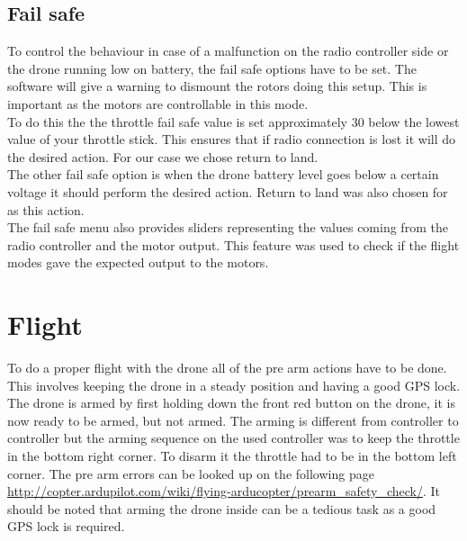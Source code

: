 \subsection*{Fail safe}
To control the behaviour in case of a malfunction on the radio controller side or the drone running
low on battery, the fail safe options have to be set. The software will give a warning to dismount
the rotors doing this setup. This is important as the motors are controllable in this mode.\\
To do this the the throttle fail safe value is set approximately 30 below the lowest value of your
throttle stick. This ensures that if radio connection is lost it will do the desired action. For our
case we chose return to land.\\
The other fail safe option is when the drone battery level goes below a certain voltage it should
perform the desired action. Return to land was also chosen for as this action.\\
The fail safe menu also provides sliders representing the values coming from the radio controller
and the motor output. This feature was used to check if the flight modes gave the expected output to
the motors.

\section{Flight}
To do a proper flight with the drone all of the pre arm actions have to be done. This involves
keeping the drone in a steady position and having a good GPS lock. The drone is armed by first
holding down the front red button on the drone, it is now ready to be armed, but not armed. The
arming is different from controller to controller but the arming sequence on the used controller was
to keep the throttle in the bottom right corner. To disarm it the throttle had to be in the bottom
left corner. The pre arm errors can be looked up on the following page
\url{http://copter.ardupilot.com/wiki/flying-arducopter/prearm_safety_check/}. It should be noted
that arming the drone inside can be a tedious task as a good GPS lock is required.\\

